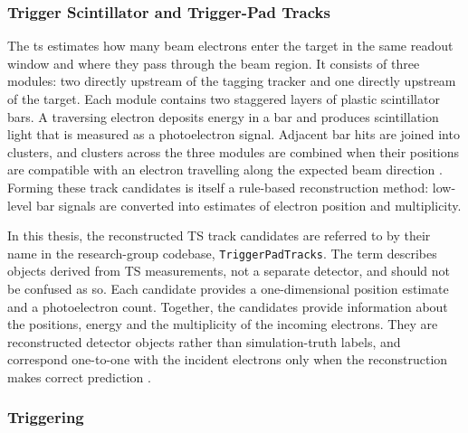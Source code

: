 \subsubsection{Trigger Scintillator and Trigger-Pad Tracks}

The \gls{ts} estimates how many beam electrons enter the target in the same
readout window and where they pass through the beam region. It consists of
three modules: two directly upstream of the tagging tracker and one directly
upstream of the target. Each module contains two staggered layers of plastic
scintillator bars. A traversing electron deposits energy in a bar and produces
scintillation light that is measured as a photoelectron signal. Adjacent bar
hits are joined into clusters, and clusters across the three modules are
combined when their positions are compatible with an electron travelling
along the expected beam direction \cite{ldmx2025-overview}. Forming these
track candidates is itself a rule-based reconstruction method: low-level bar
signals are converted into estimates of electron position and multiplicity.

In this thesis, the reconstructed TS track candidates are referred to by
their name in the research-group codebase, \texttt{TriggerPadTracks}. The
term describes objects derived from TS measurements, not a separate detector,
and should not be confused as so. Each
candidate provides a one-dimensional position estimate and a photoelectron
count. Together, the candidates provide information about the positions, energy and the 
multiplicity of the incoming electrons. They are reconstructed detector
objects rather than simulation-truth labels, and correspond one-to-one with
the incident electrons only when the reconstruction makes correct prediction \cite{ldmx2025-overview}.

\subsubsection{Triggering
}

